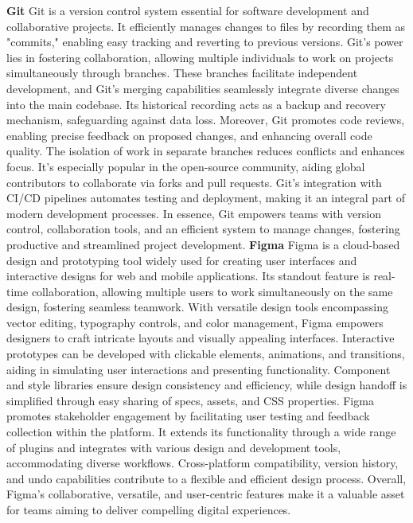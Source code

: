 \textbf{Git}
\newline
Git is a version control system essential for software development and collaborative projects. It efficiently manages changes to files by recording them as "commits," enabling easy tracking and reverting to previous versions. Git's power lies in fostering collaboration, allowing multiple individuals to work on projects simultaneously through branches. These branches facilitate independent development, and Git's merging capabilities seamlessly integrate diverse changes into the main codebase. Its historical recording acts as a backup and recovery mechanism, safeguarding against data loss. Moreover, Git promotes code reviews, enabling precise feedback on proposed changes, and enhancing overall code quality. The isolation of work in separate branches reduces conflicts and enhances focus. It's especially popular in the open-source community, aiding global contributors to collaborate via forks and pull requests. Git's integration with CI/CD pipelines automates testing and deployment, making it an integral part of modern development processes. In essence, Git empowers teams with version control, collaboration tools, and an efficient system to manage changes, fostering productive and streamlined project development.
\newline
\newline
\textbf{Figma}
\newline
Figma is a cloud-based design and prototyping tool widely used for creating user interfaces and interactive designs for web and mobile applications. Its standout feature is real-time collaboration, allowing multiple users to work simultaneously on the same design, fostering seamless teamwork. With versatile design tools encompassing vector editing, typography controls, and color management, Figma empowers designers to craft intricate layouts and visually appealing interfaces. Interactive prototypes can be developed with clickable elements, animations, and transitions, aiding in simulating user interactions and presenting functionality. Component and style libraries ensure design consistency and efficiency, while design handoff is simplified through easy sharing of specs, assets, and CSS properties. Figma promotes stakeholder engagement by facilitating user testing and feedback collection within the platform. It extends its functionality through a wide range of plugins and integrates with various design and development tools, accommodating diverse workflows. Cross-platform compatibility, version history, and undo capabilities contribute to a flexible and efficient design process. Overall, Figma's collaborative, versatile, and user-centric features make it a valuable asset for teams aiming to deliver compelling digital experiences.
